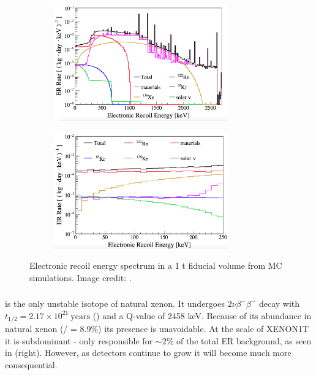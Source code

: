 \begin{figure}
    \centering
    \begin{subfigure}[t]{0.5\textwidth}
        \centering
        \includegraphics[height=5cm]{ERRateMCFull}
    \end{subfigure}%
    \begin{subfigure}[t]{0.5\textwidth}
        \centering
        \includegraphics[height=5cm]{ERRateMCZoomed}
    \end{subfigure}
    \caption{Electronic recoil energy spectrum in a 1 t fiducial volume from MC simulations.  Image credit: .}
	\label{fig:backgrounds_er_spectrum}
\end{figure}



\subsubsection{}
\label{subsubsec:backgrounds_electronic_xe}
 is the only unstable isotope of natural xenon.  It undergoes $2 \nu \beta^- \beta^-$ decay with
$t_{1/2} = 2.17 \times 10^{21}\ \mathrm{years}$ () and a Q-value of 2458 keV.  Because of its abundance in natural
xenon (/ = 8.9\%) its presence is unavoidable.  At the scale of XENON1T it is subdominant - only responsible for
${\sim}2 \%$ of the total ER background, as seen in  (right).  However, as detectors continue to grow
it will become much more consequential.



